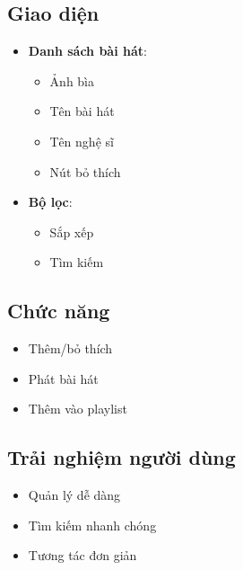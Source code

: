 \documentclass{article}
\begin{document}
\subsection{Giao diện}
\begin{itemize}
    \item \textbf{Danh sách bài hát}:
    \begin{itemize}
        \item Ảnh bìa
        \item Tên bài hát
        \item Tên nghệ sĩ
        \item Nút bỏ thích
    \end{itemize}
    \item \textbf{Bộ lọc}:
    \begin{itemize}
        \item Sắp xếp
        \item Tìm kiếm
    \end{itemize}
\end{itemize}

\subsection{Chức năng}
\begin{itemize}
    \item Thêm/bỏ thích
    \item Phát bài hát
    \item Thêm vào playlist
\end{itemize}

\subsection{Trải nghiệm người dùng}
\begin{itemize}
    \item Quản lý dễ dàng
    \item Tìm kiếm nhanh chóng
    \item Tương tác đơn giản
\end{itemize}
\end{document}
